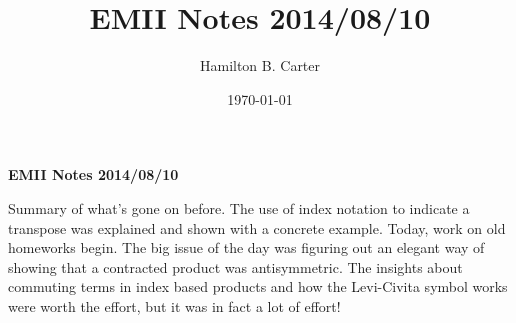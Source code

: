 \documentclass[prb,preprint]
{revtex4-1}
\begin{document}

\title{EMII Notes 2014/08/10}

\author{Hamilton B. Carter}



\date{\today}









\centerline{\bf EMII Notes 2014/08/10}
\bigskip

Summary of what's gone on before.  The use of index notation to indicate a transpose was explained and shown with a concrete example.  Today, work on old homeworks begin.  The big issue of the day was figuring out an elegant way of showing that a contracted product was antisymmetric. The insights about commuting terms in index based products and how the Levi-Civita symbol works were worth the effort, but it was in fact a lot of effort!
\end{document}
